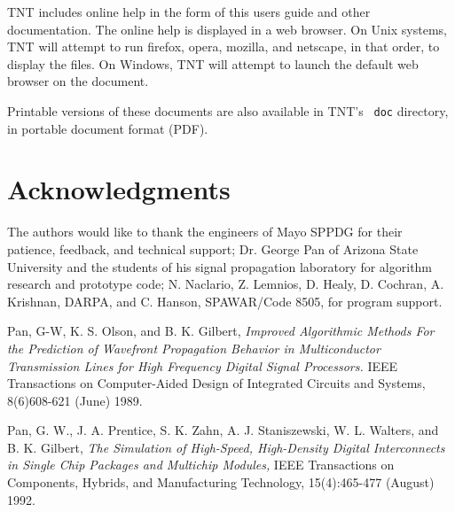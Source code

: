 \documentclass{article}
\begin{document}
TNT includes online help in the form of this users guide and other
documentation.  The online help is displayed in a web browser.  On
Unix systems, TNT will attempt to run firefox, opera, mozilla, and
netscape, in that order, to display the files.  On Windows, TNT will
attempt to launch the default web browser on the document.

Printable versions of these documents are also available in TNT's {\tt
doc} directory, in portable document format (PDF).





\section {Acknowledgments} \label{sec:acknowledgements}

The authors would like to thank the engineers of Mayo SPPDG for their
patience, feedback, and technical support; Dr. George Pan of Arizona
State University and the students of his signal propagation laboratory
for algorithm research and prototype code; N. Naclario, Z. Lemnios,
D. Healy, D. Cochran, A. Krishnan, DARPA, and C. Hanson, SPAWAR/Code
8505, for program support.






\clearpage
\begin{thebibliography}{99}


 Pan, G-W, K. S. Olson, and B. K. Gilbert, {\em
Improved Algorithmic Methods For the Prediction of Wavefront
Propagation Behavior in Multiconductor Transmission Lines for High
Frequency Digital Signal Processors.} IEEE Transactions on
Computer-Aided Design of Integrated Circuits and Systems, 8(6)608-621
(June) 1989.


 Pan, G. W., J. A. Prentice, S. K. Zahn,
A. J. Staniszewski, W. L. Walters, and B. K. Gilbert, {\em The
Simulation of High-Speed, High-Density Digital Interconnects in Single
Chip Packages and Multichip Modules,} IEEE Transactions on Components,
Hybrids, and Manufacturing Technology, 15(4):465-477 (August) 1992.





\end{thebibliography}
\end{document}
